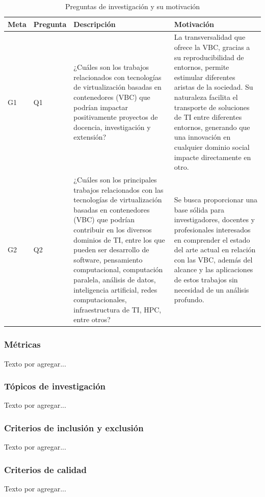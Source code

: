 \begin{table}[H]
\centering
\caption{Preguntas de investigación y su motivación}
\renewcommand{\arraystretch}{1.4}
\begin{tabularx}{\textwidth}{>{\hsize=0.5\hsize}X >{\hsize=0.6\hsize}X >{\hsize=1.5\hsize}X >{\hsize=2\hsize}X}
\toprule
\textbf{Meta} & \textbf{Pregunta} & \textbf{Descripción} & \textbf{Motivación} \\
\midrule
G1 & Q1 & ¿Cuáles son los trabajos relacionados con tecnologías de virtualización basadas en contenedores (VBC) que podrían impactar positivamente proyectos de docencia, investigación y extensión? & La transversalidad que ofrece la VBC, gracias a su reproducibilidad de entornos, permite estimular diferentes aristas de la sociedad. Su naturaleza facilita el transporte de soluciones de TI entre diferentes entornos, generando que una innovación en cualquier dominio social impacte directamente en otro. \\
\midrule
G2 & Q2 & ¿Cuáles son los principales trabajos relacionados con las tecnologías de virtualización basadas en contenedores (VBC) que podrían contribuir en los diversos dominios de TI, entre los que pueden ser desarrollo de software, pensamiento computacional, computación paralela, análisis de datos, inteligencia artificial, redes computacionales, infraestructura de TI, HPC, entre otros? & Se busca proporcionar una base sólida para investigadores, docentes y profesionales interesados en comprender el estado del arte actual en relación con las VBC, además del alcance y las aplicaciones de estos trabajos sin necesidad de un análisis profundo. \\
\bottomrule
\end{tabularx}\label{tab:preguntas}
\end{table}

\subsubsection{Métricas}

Texto por agregar...

\subsubsection{Tópicos de investigación}

Texto por agregar...

\subsubsection{Criterios de inclusión y exclusión}

Texto por agregar...

\subsubsection{Criterios de calidad}

Texto por agregar...